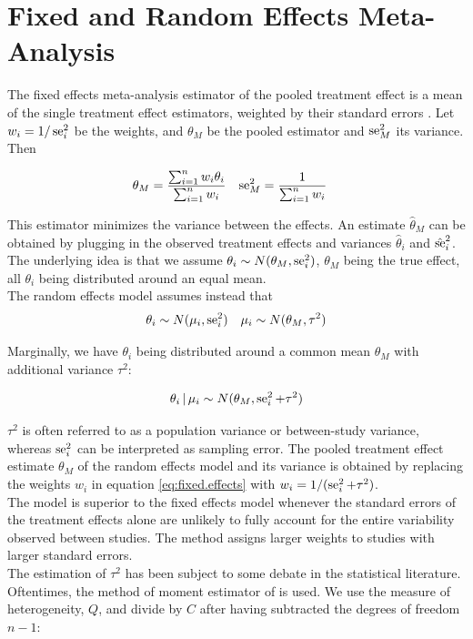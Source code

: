 \documentclass[11pt,a4paper,twoside]{book}\usepackage[]{graphicx}\usepackage[]{color}
\begin{document}
\section{Fixed and Random Effects Meta-Analysis} \label{sec:meta.analysis}
The fixed effects meta-analysis estimator of the pooled treatment effect is a mean of the single treatment effect estimators, weighted by their standard errors \citep{fixed.effects.rosenthal}. Let $w_i = 1/\operatorname{se}_i^2$ be the weights, and $\theta_M$ be the pooled estimator and $\operatorname{se}_M^2$ its variance. Then 

\begin{align}
\theta_M &= \frac{\sum_{i = 1}^n w_i \theta_i}{\sum_{i = 1}^n w_i} &
\operatorname{se}_M^2 &= \frac{1}{\sum_{i = 1}^n w_i} \label{eq:fixed.effects}
\end{align}

This estimator minimizes the variance between the effects. An estimate $\hat{\theta}_M$ can be obtained by plugging in the observed treatment effects and variances $\hat{\theta}_i$ and $\hat{\operatorname{se}}_i^2$. The underlying idea is that we assume $\theta_i \sim N(\theta_M, \operatorname{se}_i^2)$, $\theta_M$ being the true effect, all $\theta_i$ being distributed around an equal mean. \\
The random effects model \citep{whitehead} assumes instead that 
\begin{align}
\theta_i \sim N(\mu_i, \operatorname{se}_i^2) &&
\mu_i \sim N(\theta_M, \tau^2) \label{eq:random.effects} 
\end{align}

Marginally, we have $\theta_i$ being distributed around a common mean $\theta_M$ with additional variance $\tau^2$:

\begin{align}
\theta_i \given \mu_i \sim N(\theta_M, \se_i^2 + \tau^2) \nonumber %
\end{align}

$\tau^2$ is often referred to as a population variance or between-study variance, whereas $\operatorname{se}_i^2$ can be interpreted as sampling error. The pooled treatment effect estimate $\theta_M$ of the random effects model and its variance is obtained by replacing the weights $w_i$ in equation \eqref{eq:fixed.effects} with $w_i = 1/(\operatorname{se}_i^2 + \tau^2)$.\\
The model is superior to the fixed effects model whenever the standard errors of the treatment effects alone are unlikely to fully account for the entire variability observed between studies. The method assigns larger weights to studies with larger standard errors.\\
The estimation of $\tau^2$ has been subject to some debate in the statistical literature. Oftentimes, the method of moment estimator of \citet{tau.estimator} is used. We use the measure of heterogeneity, $Q$, and divide by $C$ after having subtracted the degrees of freedom $n-1$:
\end{document}

